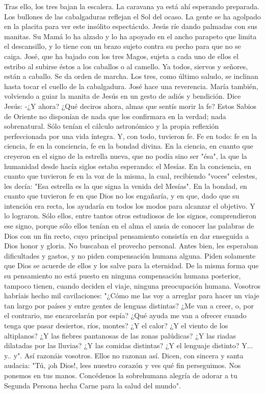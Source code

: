 \documentclass[12pt]{book} %
\begin{document}
Tras ello, los tres bajan la escalera. La caravana ya está ahí esperando preparada. Los bullones de las cabalgaduras 
reflejan el Sol del ocaso. La gente se ha agolpado en la placita para ver este insólito espectáculo. 
Jesús ríe dando palmadas con sus manitas. Su Mamá lo ha alzado y lo ha apoyado en el ancho parapeto que limita el 
descansillo, y lo tiene con un brazo sujeto contra su pecho para que no se caiga. José, que ha bajado con los tres Magos, sujeta a cada uno de ellos el estribo al subirse éstos a los caballos o al camello. 
Ya todos, siervos y señores, están a caballo. Se da orden de marcha. Los tres, como último saludo, se inclinan hasta 
tocar el cuello de la cabalgadura. José hace una reverencia. María también, volviendo a guiar la manita de Jesús en un gesto de adiós y bendición. 
Dice Jesús: 
-¿Y ahora? ¿Qué deciros ahora, almas que sentís morir la fe? Estos Sabios de Oriente no disponían de nada que los 
confirmara en la verdad; nada sobrenatural. Sólo tenían el cálculo astronómico y la propia reflexión perfeccionada por una vida íntegra. Y, con todo, tuvieron fe. Fe en todo: fe en la ciencia, fe en la conciencia, fe en la bondad divina. 
En la ciencia, en cuanto que creyeron en el signo de la estrella nueva, que no podía sino ser "ésa", la que la humanidad desde hacía siglos estaba esperando: el Mesías. En la conciencia, en cuanto que tuvieron fe en la voz de la misma, la cual, recibiendo "voces" celestes, les decía: "Esa estrella es la que signa la venida del Mesías". En la bondad, en cuanto que tuvieron fe en que Dios no los engañaría, y en que, dado que su intención era recta, los ayudaría en todos los modos para alcanzar el objetivo. 
Y lo lograron. Sólo ellos, entre tantos otros estudiosos de los signos, comprendieron ese signo, porque sólo ellos tenían 
en el alma el ansia de conocer las palabras de Dios con un fin recto, cuyo principal pensamiento consistía en dar enseguida a Dios honor y gloria. 
No buscaban el provecho personal. Antes bien, les esperaban dificultades y gastos, y no piden compensación humana 
alguna. Piden solamente que Dios se acuerde de ellos y los salve para la eternidad. 
De la misma forma que su pensamiento no está puesto en ninguna compensación humana posterior, tampoco tienen, cuando deciden el viaje, ninguna preocupación humana. Vosotros habríais hecho mil cavilaciones: "¿Cómo me las voy a arreglar para hacer un viaje tan largo por países y entre gentes de lenguas distintas? ¿Me van a creer, o, por el contrario, me encarcelarán por espía? ¿Qué ayuda me van a ofrecer cuando tenga que pasar desiertos, ríos, montes? ¿Y el calor? ¿Y el viento de los altiplanos? ¿Y las fiebres pantanosas de las zonas palúdicas? ¿Y las riadas dilatadas por las lluvias? ¿Y las comidas distintas? ¿Y el lenguaje distinto? Y... y.. y". Así razonáis vosotros. Ellos no razonan así. Dicen, con sincera y santa audacia: "Tú, ¡oh Dios!, lees nuestro corazón y ves qué fin perseguimos. Nos ponemos en tus manos. Concédenos la sobrehumana alegría de adorar a tu Segunda Persona hecha Carne para la salud del mundo". 
\end{document}

